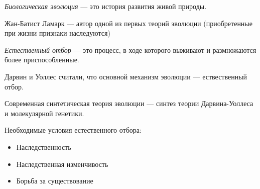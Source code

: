 \documentclass[dvipdfmx]{article}
\begin{document}
\emph{Биологическая эволюция} --- это история развития живой природы.

Жан-Батист Ламарк --- автор одной из первых теорий эволюции (приобретенные при жизни признаки наследуются)

\emph{Естественный отбор} --- это процесс, в ходе которого выживают и размножаются более приспособленные.

Дарвин и Уоллес считали, что основной механизм эволюции --- ествественный отбор.

Современная синтетическая теория эволюции --- синтез теории Дарвина-Уоллеса и молекулярной генетики.

Необходимые условия естественного отбора:
\begin{itemize}
\item
  Наследственность
\item
  Наследственная изменчивость
\item
  Борьба за существование
\end{itemize}
\end{document}
